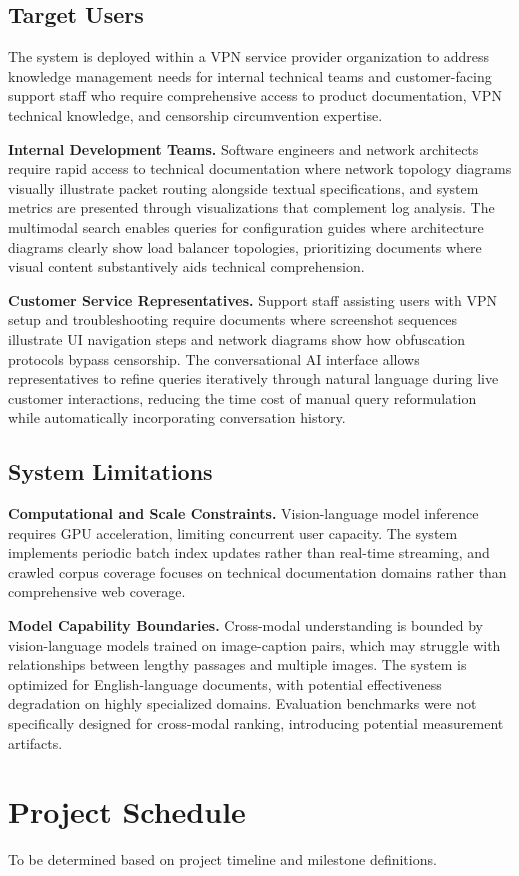 \subsection{Target Users}

The system is deployed within a VPN service provider organization to address knowledge management needs for internal technical teams and customer-facing support staff who require comprehensive access to product documentation, VPN technical knowledge, and censorship circumvention expertise.

\textbf{Internal Development Teams.} Software engineers and network architects require rapid access to technical documentation where network topology diagrams visually illustrate packet routing alongside textual specifications, and system metrics are presented through visualizations that complement log analysis. The multimodal search enables queries for configuration guides where architecture diagrams clearly show load balancer topologies, prioritizing documents where visual content substantively aids technical comprehension.

\textbf{Customer Service Representatives.} Support staff assisting users with VPN setup and troubleshooting require documents where screenshot sequences illustrate UI navigation steps and network diagrams show how obfuscation protocols bypass censorship. The conversational AI interface allows representatives to refine queries iteratively through natural language during live customer interactions, reducing the time cost of manual query reformulation while automatically incorporating conversation history.

\subsection{System Limitations}

\textbf{Computational and Scale Constraints.} Vision-language model inference requires GPU acceleration, limiting concurrent user capacity. The system implements periodic batch index updates rather than real-time streaming, and crawled corpus coverage focuses on technical documentation domains rather than comprehensive web coverage.

\textbf{Model Capability Boundaries.} Cross-modal understanding is bounded by vision-language models trained on image-caption pairs, which may struggle with relationships between lengthy passages and multiple images. The system is optimized for English-language documents, with potential effectiveness degradation on highly specialized domains. Evaluation benchmarks were not specifically designed for cross-modal ranking, introducing potential measurement artifacts.

\section{Project Schedule}

To be determined based on project timeline and milestone definitions.